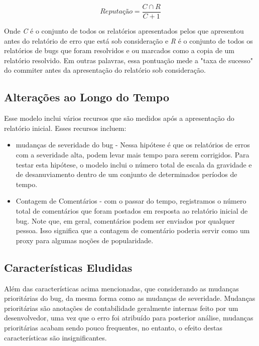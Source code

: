 \documentclass[12pt,a4paper,final]{report}
\begin{document}
\[Reputação =\frac{C \cap R}{C + 1}\]

Onde \textit{C} é o conjunto de todos os relatórios apresentados pelos que apresentou antes do relatório de erro que está sob consideração e \textit{R} é o conjunto de todos os relatórios de bugs que foram resolvidos e ou
marcados como a copia de um relatório resolvido. Em outras palavras, essa pontuação mede a "taxa de sucesso" do commiter antes da apresentação do relatório sob consideração.
\label{altlogp}
\subsection{Alterações ao Longo do Tempo}

Esse modelo inclui vários recursos que são medidos após a apresentação do relatório inicial. Esses recursos incluem:
\begin{itemize}
\item mudanças de severidade do bug - Nessa hipótese é que os relatórios de erros com a severidade alta, podem levar mais tempo para serem corrigidos. Para testar esta hipótese, o modelo inclui o número total de escala da gravidade e de desanuviamento dentro de um conjunto de determinados períodos de tempo.
\item Contagem de Comentários - 
com o passar do tempo, registramos o número total de comentários que foram postados em resposta ao relatório inicial de bug. Note que, em geral, comentários podem ser enviados por qualquer pessoa. Isso significa que a contagem de comentário poderia servir como um proxy para algumas noções de popularidade.
\end{itemize} 
\subsection{Características Eludidas}
Além das características acima mencionadas, que considerando as
mudanças prioritárias do bug, da mesma forma como as mudanças de severidade. Mudanças prioritárias são anotações de contabilidade geralmente internas feito por um desenvolvedor, uma vez que o erro foi atribuído para posterior análise, mudanças prioritárias acabam sendo pouco frequentes, no entanto, o efeito destas características são  insignificantes.

\medskip
\printbibliography
\end{document}
